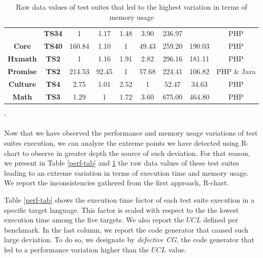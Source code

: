 \begin{table}[h]
{\begin{tabular}{|c|c|c|c|c|c|c|c|c|}
			& \textbf{TS34}       & 1                              & 1.17        & 1.48         & 3.90        & \cellcolor[HTML]{E8E8E8}236.97       &                          & PHP                   \\ \cline{2-7} \cline{9-9} 
			\multirow{-8}{*}{\textbf{Core}}  & \textbf{TS40}       & 160.84                         & 1.10        & 1            & 49.43       & \cellcolor[HTML]{E8E8E8}259.20       & \multirow{-8}{*}{190.03} & PHP                   \\ \hline
			\textbf{Hxmath}                  & \textbf{TS2}        & 1                              & 1.16        & 1.91         & 2.82        & \cellcolor[HTML]{E8E8E8}296.16       & 181.11                   & PHP                   \\ \hline
			\textbf{Promise}                 & \textbf{TS2}        & \cellcolor[HTML]{E8E8E8}214.53 & 92.45       & 1            & 57.68       & \cellcolor[HTML]{E8E8E8}224.41       & 106.82                   & PHP \& Java           \\ \hline
			\textbf{Culture}                 & \textbf{TS4}        & 2.75                           & 1.01        & 2.52         & 1           & \cellcolor[HTML]{E8E8E8}52.47        & 34.63                    & PHP                   \\ \hline
			\textbf{Math}                    & \textbf{TS3}        & 1.29                           & 1           & 1.72         & 3.60        & \cellcolor[HTML]{E8E8E8}675.00       & 464.80                   & PHP                   \\ \hline
		\end{tabular}%
	}
	\caption{Raw data values of test suites that led to the highest variation in terms of memory usage}
	\label{mem-tab}`
\end{table}

Now that we have observed the performance and memory usage variations of test suites execution, we can analyze the extreme points we have detected using R-chart to observe in greater depth the source of such deviation.
For that reason, we present in Table \ref{perf-tab} and \ref{mem-tab} the raw data values of these test suites leading to an extreme variation in terms of execution time and memory usage. We report the inconsistencies gathered from the first approach, R-chart.

Table \ref{perf-tab} shows the execution time factor of each test suite execution in a specific target language. This factor is scaled with respect to the the lowest execution time among the five targets. We also report the $UCL$ defined per benchmark. In the last column, we report the code generator that caused such large deviation. To do so, we designate by \textit{defective CG}, the code generator that led to a performance variation higher than the $UCL$ value.

